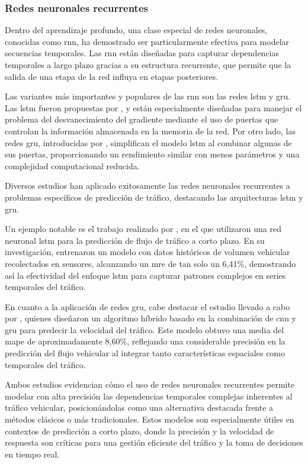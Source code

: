 \subsubsection{Redes neuronales recurrentes}

Dentro del aprendizaje profundo, una clase especial de redes neuronales, conocidas como \acrfull{rnn}, ha demostrado ser particularmente efectiva para modelar secuencias temporales. Las \acrshort{rnn} están diseñadas para capturar dependencias temporales a largo plazo gracias a su estructura recurrente, que permite que la salida de una etapa de la red influya en etapas posteriores.

Las variantes más importantes y populares de las \acrshort{rnn} son las redes \acrlong{lstm} y \acrlong{gru}. Las \acrshort{lstm} fueron propuestas por \cite{hochreiter1997long}, y están especialmente diseñadas para manejar el problema del desvanecimiento del gradiente mediante el uso de puertas que controlan la información almacenada en la memoria de la red. Por otro lado, las redes \acrshort{gru}, introducidas por \cite{cho2014gru}, simplifican el modelo \acrshort{lstm} al combinar algunas de sus puertas, proporcionando un rendimiento similar con menos parámetros y una complejidad computacional reducida.

Diversos estudios han aplicado exitosamente las redes neuronales recurrentes a problemas específicos de predicción de tráfico, destacando las arquitecturas \acrshort{lstm} y \acrshort{gru}.

Un ejemplo notable es el trabajo realizado por \cite{zhao2017lstm}, en el que utilizaron una red neuronal \acrshort{lstm} para la predicción de flujo de tráfico a corto plazo. En su investigación, entrenaron un modelo con datos históricos de volumen vehicular recolectados en sensores, alcanzando un \acrfull{mre} de tan solo un 6,41\%, demostrando así la efectividad del enfoque \acrshort{lstm} para capturar patrones complejos en series temporales del tráfico.

En cuanto a la aplicación de redes \acrshort{gru}, cabe destacar el estudio llevado a cabo por \cite{ma2022cnn_gru}, quienes diseñaron un algoritmo híbrido basado en la combinación de \acrshort{cnn} y \acrshort{gru} para predecir la velocidad del tráfico. Este modelo obtuvo una media del \acrshort{mape} de aproximadamente 8,60\%, reflejando una considerable precisión en la predicción del flujo vehicular al integrar tanto características espaciales como temporales del tráfico.

Ambos estudios evidencian cómo el uso de redes neuronales recurrentes permite modelar con alta precisión las dependencias temporales complejas inherentes al tráfico vehicular, posicionándolas como una alternativa destacada frente a métodos clásicos o más tradicionales. Estos modelos son especialmente útiles en contextos de predicción a corto plazo, donde la precisión y la velocidad de respuesta son críticas para una gestión eficiente del tráfico y la toma de decisiones en tiempo real.

